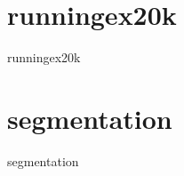 \section{runningex20k}
\label{sec:dataSets:runningex20k}
\begin{dataSetDescription}{runningex20k}
\end{dataSetDescription}

\section{segmentation}
\label{sec:dataSets:segmentation}
\begin{dataSetDescription}{segmentation}
\end{dataSetDescription}
